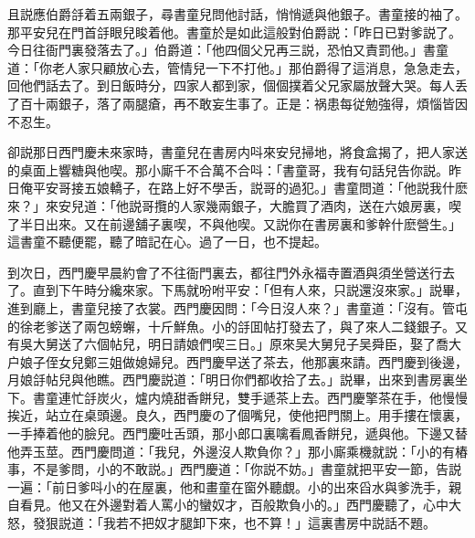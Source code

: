 且説應伯爵㧱着五兩銀子，尋書童兒問他討話，悄悄遞與他銀子。書童接的袖了。那平安兒在門首㧱眼兒睃着他。書童於是如此這般對伯爵説：「昨日已對爹説了。今日往衙門裏發落去了。」伯爵道：「他四個父兄再三説，恐怕又責罰他。」書童道：「你老人家只顧放心去，管情兒一下不打他。」那伯爵得了這消息，急急走去，回他們話去了。到日飯時分，四家人都到家，個個撲着父兄家屬放聲大哭。每人丢了百十兩銀子，落了兩腿瘡，再不敢妄生事了。正是：祸患每従勉強得，煩惱皆因不忍生。

卻説那日西門慶未來家時，書童兒在書房内呌來安兒掃地，將食盒揭了，把人家送的桌面上響糖與他喫。那小廝千不合萬不合呌：「書童哥，我有句話兒告你説。昨日俺平安哥接五娘轎子，在路上好不學舌，説哥的過犯。」書童問道：「他説我什麽來？」來安兒道：「他説哥攬的人家幾兩銀子，大膽買了酒肉，送在六娘房裏，喫了半日出來。又在前邊舖子裏喫，不與他喫。又説你在書房裏和爹幹什麽營生。」這書童不聽便罷，聽了暗記在心。過了一日，也不提起。

到次日，西門慶早晨約會了不往衙門裏去，都往門外永福寺置酒與須坐營送行去了。直到下午時分纔來家。下馬就吩咐平安：「但有人來，只説還沒來家。」説畢，進到廳上，書童兒接了衣裳。西門慶因問：「今日沒人來？」書童道：「沒有。管屯的徐老爹送了兩包螃蠏，十斤鮮魚。小的㧱囬帖打發去了，與了來人二錢銀子。又有吳大舅送了六個帖兒，明日請娘們喫三日。」原來吴大舅兒子吴舜臣，娶了喬大户娘子侄女兒鄭三姐做媳婦兒。西門慶早送了茶去，他那裏來請。西門慶到後邊，月娘㧱帖兒與他瞧。西門慶説道：「明日你們都收拾了去。」説畢，出來到書房裏坐下。書童連忙㧱炭火，爐内燒甜香餅兒，雙手遞茶上去。西門慶擎茶在手，他慢慢挨近，站立在桌頭邊。良久，西門慶の了個嘴兒，使他把門關上。用手摟在懷裏，一手捧着他的臉兒。西門慶吐舌頭，那小郎口裏噙看鳳香餅兒，遞與他。下邊又替他弄玉莖。西門慶問道：「我兒，外邊沒人欺負你？」那小廝乘機就説：「小的有樁事，不是爹問，小的不敢説。」西門慶道：「你説不妨。」書童就把平安一節，告説一遍：「前日爹呌小的在屋裏，他和畫童在窗外聽覷。小的出來舀水與爹洗手，親自看見。他又在外邊對着人罵小的蠻奴才，百般欺負小的。」西門慶聽了，心中大怒，發狠説道：「我若不把奴才腿卸下來，也不算！」這裏書房中説話不題。

